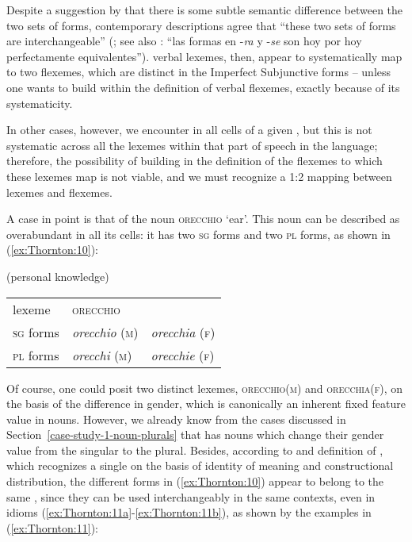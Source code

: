 \documentclass[output=paper]{langsci/langscibook}
\begin{document}
Despite a suggestion by %
\citet{Bolinger1956} %
%
that there is some subtle
semantic difference between the two sets of forms, contemporary
descriptions agree that ``these two sets of forms are interchangeable''
%
(\citet[167]{ButtBenjamin2000}; see also \citet[2910]{RojoVeiga1999}: ``las
formas en -\emph{ra} y -\emph{se} son hoy por hoy perfectamente
equivalentes'').  verbal lexemes, then, appear to systematically
map to two flexemes, which are distinct in the Imperfect Subjunctive
forms -- unless one wants to build  within the definition
of  verbal flexemes, exactly because of its systematicity.

In other cases, however, we encounter  in all cells of a
given , but this is not systematic across all the lexemes within
that part of speech in the language; therefore, the possibility of
building  in the definition of the flexemes to which these
lexemes map is not viable, and we must recognize a 1:2 mapping between
lexemes and flexemes.

A case in point is that of the  noun \textsc{orecchio} `ear'.
This noun can be described as overabundant in all its cells: it has two
\textsc{sg} forms and two \textsc{pl} forms, as shown in (\ref{ex:Thornton:10}):

\ea\label{ex:Thornton:10}  (personal knowledge)

\begin{tabular}{@{}lll}
lexeme & \textsc{orecchio} & \\
\textsc{sg} forms& \emph{orecchio} \textsc{(m)} &
\emph{orecchia} \textsc{(f)}\\

\textsc{pl} forms& \emph{orecchi} \textsc{(m)} &
\emph{orecchie} \textsc{(f)}\\
\end{tabular}
\z

Of course, one could posit two distinct lexemes, \textsc{orecchio(m)}
and \textsc{orecchia(f),} on the basis of the difference in gender,
which is canonically an inherent fixed feature value in nouns. However,
we already know from the cases discussed in Section~\ref{case-study-1-noun-plurals} that  has nouns
which change their gender value from the singular to the plural.
Besides, according to  and  definition of
, which recognizes a single  on the basis of identity of
meaning and constructional distribution, the different forms in (\ref{ex:Thornton:10})
appear to belong to the same , since they can be used
interchangeably in the same contexts, even in idioms (\ref{ex:Thornton:11a}-\ref{ex:Thornton:11b}), as shown
by the examples in (\ref{ex:Thornton:11}):
\end{document}
